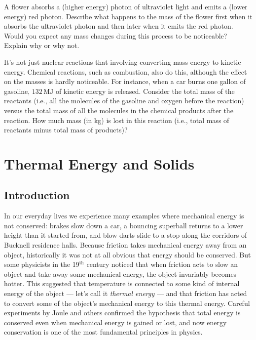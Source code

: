 \begin{exercise}
  A flower absorbs a (higher energy) photon of ultraviolet light and
  emits a (lower energy) red photon. Describe what happens to the mass 
  of the flower first when it absorbs the ultraviolet photon and then
  later when it emits the red photon.  Would you expect any mass
  changes during this process to be noticeable?  Explain why or why not.
\end{exercise}

\begin{exercise}
  It's not just nuclear reactions that involving converting mass-energy to
  kinetic energy.  Chemical reactions, such as combustion, also do this,
  although the effect on the masses is hardly noticeable.  For instance,
  when a car burns one gallon of gasoline, $132\,\text{MJ}$ of kinetic energy
  is released.  Consider the total mass of the reactants (i.e., all
  the molecules of the gasoline and oxygen before the reaction) versus
  the total mass of all the molecules in the chemical products after
  the reaction.  How much mass (in kg) is lost in this reaction (i.e.,
  total mass of reactants minus total mass of products)?
\end{exercise}


\chapter{Thermal Energy and Solids}
\label{chap:thermal_energy}


\section{Introduction}

In our everyday lives we experience many examples where mechanical
energy is not conserved: brakes slow down a car, a bouncing superball
returns to a lower height than it started from, and blow darts slide
to a stop along the corridors of Bucknell residence halls.  Because
friction takes mechanical energy away from an object, historically
it was not at all obvious that energy should be conserved.
But some physicists in the 19$^\text{th}$ century noticed that when friction
acts to slow an object and take away some mechanical energy, the
object invariably becomes hotter.  This suggested that temperature is
connected to some kind of internal energy of the object --- let's call
it \textit{thermal energy} --- and that friction has acted to convert
some of the object's mechanical energy to this thermal energy.
Careful experiments by Joule and others confirmed the hypothesis that
total energy is conserved even when mechanical energy is gained or
lost, and now energy conservation is one of the most fundamental
principles in physics.

